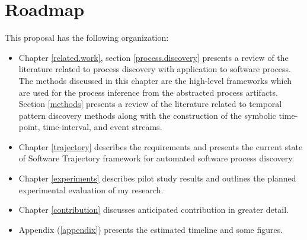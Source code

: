 \section{Roadmap}
This proposal has the following organization:
\begin{itemize}
	\item Chapter \ref{related.work}, section \ref{process.discovery} presents a review of the literature related to process discovery with application to software process. The methods discussed in this chapter are the high-level frameworks which are used for the process inference from the abstracted process artifacts. Section \ref{methods} presents a review of the literature related to temporal pattern discovery methods along with the construction of the symbolic time-point, time-interval, and event streams.
	\item Chapter \ref{trajectory} describes the requirements and presents the current state of Software Trajectory framework for automated software process discovery.
	\item Chapter \ref{experiments} describes pilot study results and outlines the planned experimental evaluation of my research.
	\item Chapter \ref{contribution} discusses anticipated contribution in greater detail.
	\item Appendix (\ref{appendix}) presents the estimated timeline and some figures.
\end{itemize}
